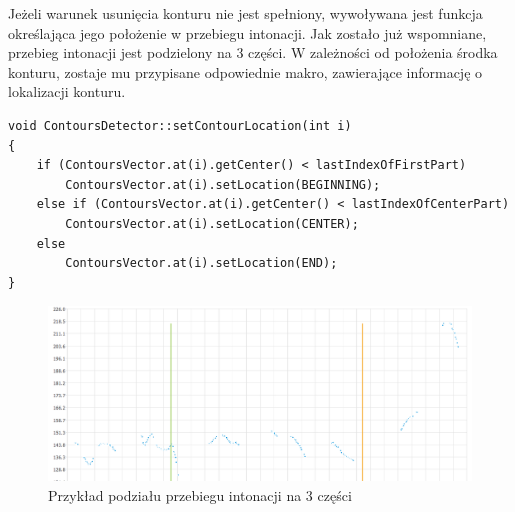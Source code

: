 \documentclass[a4paper,12 pt]{article}
\begin{document}
Jeżeli warunek usunięcia konturu nie jest spełniony, wywoływana jest funkcja określająca jego położenie w przebiegu intonacji. Jak zostało już wspomniane, przebieg intonacji jest podzielony na 3 części. W zależności od położenia środka konturu, zostaje mu przypisane odpowiednie makro, zawierające informację o lokalizacji konturu.
\begin{lstlisting}
void ContoursDetector::setContourLocation(int i)
{
    if (ContoursVector.at(i).getCenter() < lastIndexOfFirstPart)
        ContoursVector.at(i).setLocation(BEGINNING);
    else if (ContoursVector.at(i).getCenter() < lastIndexOfCenterPart)
        ContoursVector.at(i).setLocation(CENTER);
    else
        ContoursVector.at(i).setLocation(END);
}
\end{lstlisting}
 \FloatBarrier
\begin{figure}[h]
\centering
\includegraphics[scale=0.7]{podzial_wykresu.png}
\caption{Przykład podziału przebiegu intonacji na 3 części}
\end{figure}
\FloatBarrier
\end{document}
